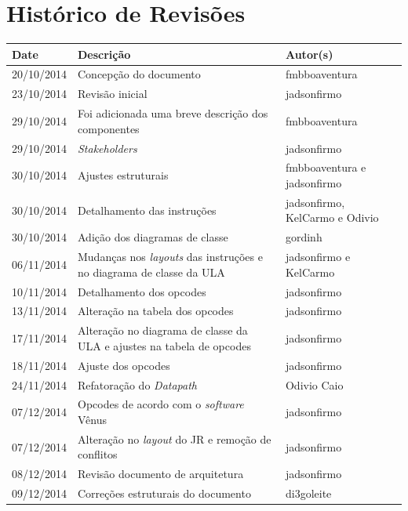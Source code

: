 \documentclass{report}
\begin{document}

\capa
\newpage
\newpage

\chapter*{Histórico de Revisões}
  \vspace*{1cm}
  \begin{table}[ht]
    \centering
    \begin{tabular}[pos]{|m{2cm} | m{8cm} | m{4cm}|} 
      \hline
      \cellcolor[gray]{0.9}
      \textbf{Date} & \cellcolor[gray]{0.9}\textbf{Descrição} & \cellcolor[gray]{0.9}\textbf{Autor(s)}\\
      \hline 20/10/2014 & Concepção do documento & fmbboaventura \\ \hline
      		 23/10/2014 & Revisão inicial & jadsonfirmo \\ \hline
      		 29/10/2014 & Foi adicionada uma breve descrição dos componentes & fmbboaventura \\ \hline       
      		 29/10/2014 & \textit{Stakeholders} & jadsonfirmo \\ \hline
      		 30/10/2014 & Ajustes estruturais & fmbboaventura e jadsonfirmo \\ \hline
      		 30/10/2014 & Detalhamento das instruções & jadsonfirmo, KelCarmo e Odivio \\ \hline
      		 30/10/2014 & Adição dos diagramas de classe & gordinh \\ \hline
      		 06/11/2014 & Mudanças nos \textit{layouts} das instruções e no diagrama de classe da ULA & jadsonfirmo e KelCarmo \\ \hline
      		 10/11/2014 & Detalhamento dos opcodes & jadsonfirmo \\ \hline
      		 13/11/2014 & Alteração na tabela dos opcodes & jadsonfirmo \\ \hline
      		 17/11/2014 & Alteração no diagrama de classe da ULA e ajustes na tabela de opcodes & jadsonfirmo \\ \hline
      		 18/11/2014 & Ajuste dos opcodes & jadsonfirmo \\ \hline
 		     24/11/2014 & Refatoração do \textit{Datapath} & Odivio Caio \\ \hline
		  	 07/12/2014 & Opcodes de acordo com o \textit{software} Vênus & jadsonfirmo \\ \hline
		  	 07/12/2014 & Alteração no \textit{layout} do JR e remoção de conflitos & jadsonfirmo \\ \hline
		  	 08/12/2014 & Revisão documento de arquitetura & jadsonfirmo \\ \hline
		  	 09/12/2014 & Correções estruturais do documento & di3goleite \\ \hline
    \end{tabular}
  \end{table}
\end{document}

